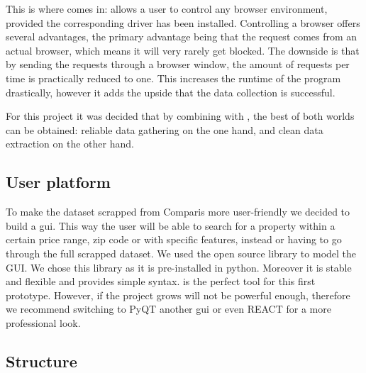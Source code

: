 \documentclass[main]{subfiles}
\begin{document}
This is where \pkg[Selenium] comes in: \pkg[Selenium] allows a user to control any browser environment,
provided the corresponding driver has been installed.
Controlling a browser offers several advantages, the primary advantage being that the request comes from an actual browser,
which means it will very rarely get blocked. 
The downside is that by sending the requests through a browser window, 
the amount of requests per time is practically reduced to one.
This increases the runtime of the program drastically, 
however it adds the upside that the data collection is successful.

For this project it was decided that by combining \pkg[Selenium] with \pkg[Scrapy], the best of both worlds can be obtained:
reliable data gathering on the one hand, and clean data extraction on the other hand.


\subsection{User platform}
To make the dataset scrapped from Comparis more user-friendly we decided to build a \ac{gui}.
This way the user will be able to search for a property within a certain price range, zip code or with specific features, 
instead or having to go through the full scrapped dataset.
We used the open source library \pkg[tkinter] to model the GUI. We chose this library as it is pre-installed in python.
Moreover it is stable and flexible and provides simple syntax.
\pkg[tkinter] is the perfect tool for this first prototype. However, if the project grows \pkg[tkinter] will not be powerful enough,
therefore we recommend switching to PyQT another \ac{gui} or even REACT for a more professional look. 


\subsection{Structure}
\end{document}
